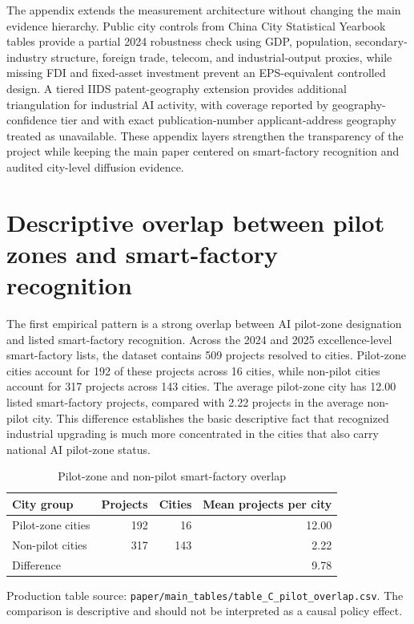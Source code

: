 \documentclass[12pt]{article}
\begin{document}
The appendix extends the measurement architecture without changing the main evidence hierarchy. Public city controls from China City Statistical Yearbook tables provide a partial 2024 robustness check using GDP, population, secondary-industry structure, foreign trade, telecom, and industrial-output proxies, while missing FDI and fixed-asset investment prevent an EPS-equivalent controlled design. A tiered IIDS patent-geography extension provides additional triangulation for industrial AI activity, with coverage reported by geography-confidence tier and with exact publication-number applicant-address geography treated as unavailable. These appendix layers strengthen the transparency of the project while keeping the main paper centered on smart-factory recognition and audited city-level diffusion evidence.

\section{Descriptive overlap between pilot zones and smart-factory recognition}
\label{sec:overlap}

The first empirical pattern is a strong overlap between AI pilot-zone designation and listed smart-factory recognition. Across the 2024 and 2025 excellence-level smart-factory lists, the dataset contains 509 projects resolved to cities. Pilot-zone cities account for 192 of these projects across 16 cities, while non-pilot cities account for 317 projects across 143 cities. The average pilot-zone city has 12.00 listed smart-factory projects, compared with 2.22 projects in the average non-pilot city. This difference establishes the basic descriptive fact that recognized industrial upgrading is much more concentrated in the cities that also carry national AI pilot-zone status.

\begin{table}[t]
\centering
\caption{Pilot-zone and non-pilot smart-factory overlap}
\label{tab:pilot_overlap}
\begin{threeparttable}
\begin{tabular}{lrrr}
\toprule
City group & Projects & Cities & Mean projects per city \\
\midrule
Pilot-zone cities & 192 & 16 & 12.00 \\
Non-pilot cities & 317 & 143 & 2.22 \\
Difference &  &  & 9.78 \\
\bottomrule
\end{tabular}
\begin{tablenotes}
\item Production table source: \texttt{paper/main\_tables/table\_C\_pilot\_overlap.csv}. The comparison is descriptive and should not be interpreted as a causal policy effect.
\end{tablenotes}
\end{threeparttable}
\end{table}
\end{document}
